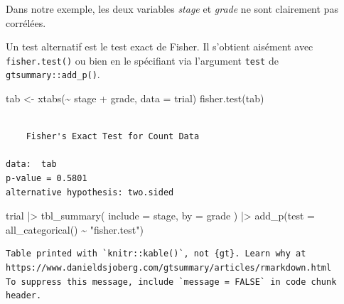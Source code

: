 \documentclass[
  letterpaper,
  DIV=11,
  numbers=noendperiod,
  oneside]{scrreprt}
\newenvironment{Shaded}{\begin{snugshade}}{\end{snugshade}}
\newcommand{\AttributeTok}[1]{\textcolor[rgb]{0.40,0.45,0.13}{#1}}
\newcommand{\FunctionTok}[1]{\textcolor[rgb]{0.28,0.35,0.67}{#1}}
\newcommand{\NormalTok}[1]{\textcolor[rgb]{0.00,0.23,0.31}{#1}}
\newcommand{\OtherTok}[1]{\textcolor[rgb]{0.00,0.23,0.31}{#1}}
\newcommand{\SpecialCharTok}[1]{\textcolor[rgb]{0.37,0.37,0.37}{#1}}
\newcommand{\StringTok}[1]{\textcolor[rgb]{0.13,0.47,0.30}{#1}}
\begin{document}
Dans notre exemple, les deux variables \emph{stage} et \emph{grade} ne
sont clairement pas corrélées.

Un test alternatif est le test exact de Fisher. Il s'obtient aisément
avec \texttt{fisher.test()} ou bien en le spécifiant via l'argument
\texttt{test} de \texttt{gtsummary::add\_p()}.

\begin{Shaded}
\begin{Highlighting}[]
\NormalTok{tab }\OtherTok{\textless{}{-}} \FunctionTok{xtabs}\NormalTok{(}\SpecialCharTok{\textasciitilde{}}\NormalTok{ stage }\SpecialCharTok{+}\NormalTok{ grade, }\AttributeTok{data =}\NormalTok{ trial)}
\FunctionTok{fisher.test}\NormalTok{(tab)}
\end{Highlighting}
\end{Shaded}

\begin{verbatim}

    Fisher's Exact Test for Count Data

data:  tab
p-value = 0.5801
alternative hypothesis: two.sided
\end{verbatim}

\begin{Shaded}
\begin{Highlighting}[]
\NormalTok{trial }\SpecialCharTok{|\textgreater{}} 
  \FunctionTok{tbl\_summary}\NormalTok{(}
    \AttributeTok{include =}\NormalTok{ stage,}
    \AttributeTok{by =}\NormalTok{ grade}
\NormalTok{  ) }\SpecialCharTok{|\textgreater{}} 
  \FunctionTok{add\_p}\NormalTok{(}\AttributeTok{test =} \FunctionTok{all\_categorical}\NormalTok{() }\SpecialCharTok{\textasciitilde{}} \StringTok{"fisher.test"}\NormalTok{)}
\end{Highlighting}
\end{Shaded}

\begin{verbatim}
Table printed with `knitr::kable()`, not {gt}. Learn why at
https://www.danieldsjoberg.com/gtsummary/articles/rmarkdown.html
To suppress this message, include `message = FALSE` in code chunk header.
\end{verbatim}
\end{document}
